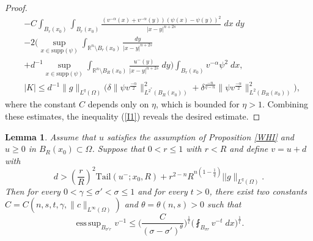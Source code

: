 \documentclass[11pt, notitlepage]{article}
\def\R{\mathbb{R}}
\DeclareMathOperator*{\esssup}{ess\,sup}
\newtheorem{Lemma}[Theorem]{Lemma}
\begin{document}
{\begin{proof}
\begin{align*}
    &-C\int_{B_r(x_0)}\int_{B_r(x_0)}\frac{(v^{-\alpha}(x)+v^{-\alpha}(y))(\psi(x)-\psi(y))^2}{|x-y|^{n+2s}}\;dx\;dy \nonumber\\
    &-2\Big(\sup_{x\in\mathrm{supp}(\psi)}\int_{\R^n\setminus B_r(x_0)}\frac{dy}{|x-y|^{n+2s}}\nonumber\\
        &+d^{-1}\sup_{x\in\mathrm{supp}(\psi)}\int_{\R^n\setminus B_{R}(x_0)}\frac{u^{-}(y)}{|x-y|^{n+2s}}\;dy\Big)\int_{B_r(x_0)}v^{-\alpha}\psi^2\;dx,\nonumber\\
    &|K|\leq d^{-1}\|g\|_{L^q(\Omega)}\Big(\delta\|\psi v^\frac{-\alpha}{2}\|_{L^{2^*}(B_R(x_0))}^2+\delta^\frac{-n}{q-n}\|\psi v^\frac{-\alpha}{2}\|_{L^{2}(B_R(x_0))}^2\Big),
\end{align*}
where the constant $C$ depends only on $\eta$, which is bounded for $\eta>1$. Combining these estimates, the inequality (\ref{I1}) reveals the desired estimate.
\end{proof}
\begin{Lemma}\label{localbound}
    Assume that $u$ satisfies the assumption of Proposition \ref{WHI} and $u\geq 0$ in $B_R(x_0)\subset\Omega$. Suppose that $0<r\leq 1$ with $r<R$ and define $v=u+d$ with
    $$d>\left(\frac{r}{R}\right)^2 \mathrm{Tail}(u^-;x_0,R)+r^{2-n}R^{n(1-\frac{1}{q})}||g\|_{L^q(\Omega)}.$$ Then for every $0<\gamma\leq \sigma'<\sigma\leq 1$ and for every $t>0$, there exist two constants $C=C(n,s,t,\gamma,\|c\|_{L^\infty(\Omega)})$ and $\theta=\theta(n,s)>0$ such that 
    $$\esssup_{B_{\sigma'r}}v^{-1}\leq \Big(\frac{C}{(\sigma-\sigma')^\theta}\Big)^\frac{1}{t}\Big(\fint_{B_{\sigma r}}v^{-t}\;dx\Big)^\frac{1}{t}.$$
   

\end{Lemma}}
\end{document}

